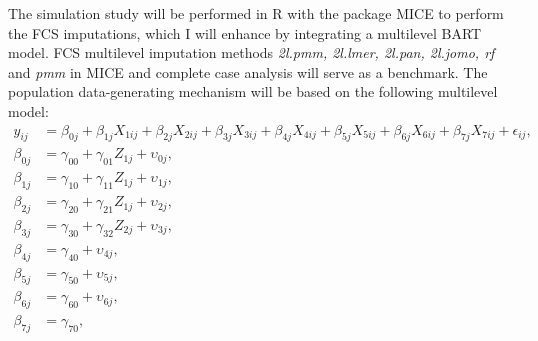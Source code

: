 \documentclass[10pt, a4paper, titlepage]{article}
\begin{document}
The simulation study will be performed in R \citep{rcoreteam2023} with the package MICE \citep{buuren2011} to perform the FCS imputations, which I will enhance by integrating a multilevel BART model. FCS multilevel imputation methods \textit{2l.pmm, 2l.lmer, 2l.pan, 2l.jomo, rf} and \textit{pmm} in MICE and complete case analysis will serve as a benchmark. The population data-generating mechanism will be based on the following multilevel model:
\begin{subequations}
\label{eq:population}
\begin{align}
y_{ij} &= \beta_{0j} + \beta_{1j}X_{1ij} + \beta_{2j}X_{2ij} + \beta_{3j}X_{3ij} + \beta_{4j}X_{4ij} + \beta_{5j}X_{5ij} + \beta_{6j}X_{6ij} + \beta_{7j}X_{7ij} + \epsilon_{ij}, \tag{4} \\
\beta_{0j} &= \gamma_{00} + \gamma_{01}Z_{1j} + \upsilon_{0j}, \tag{4.1} \\
\beta_{1j} &= \gamma_{10} + \gamma_{11}Z_{1j} + \upsilon_{1j}, \tag{4.2} \\
\beta_{2j} &= \gamma_{20} + \gamma_{21}Z_{1j} + \upsilon_{2j}, \tag{4.3} \\
\beta_{3j} &= \gamma_{30} + \gamma_{32}Z_{2j} + \upsilon_{3j}, \tag{4.4} \\
\beta_{4j} &= \gamma_{40} + \upsilon_{4j}, \tag{4.5} \\
\beta_{5j} &= \gamma_{50} + \upsilon_{5j}, \tag{4.6} \\
\beta_{6j} &= \gamma_{60} + \upsilon_{6j}, \tag{4.7} \\
\beta_{7j} &= \gamma_{70}, \tag{4.8}
\end{align}
\end{subequations}
\end{document}
